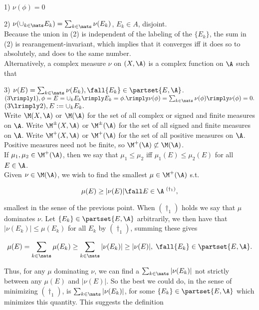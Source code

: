 1) $\nu(\phi) = 0$

2) $\nu( \cup_{k\in \nats} E_k ) = \sum_{k \in \nats} \nu(E_k) $, $E_k \in A$, disjoint.  \\

Because the union in (2) is independent of the labeling of the $\{ E_k \}$, the sum in (2) is rearangement-invariant, which implies that it converges iff it does so to absolutely, and does to the same number. \\

Alternatively, a complex measure $\nu$ on $(X,\A)$ is a complex function on $\A$ such that

3) $\nu(E) = \sum_{k \in \nats} \nu(E_k), \fall \{ E_k\} \in \partset{E, \A}$.\\

$(3 \rimply 1), \phi = E = \cup_k E_k \rimply E_k = \phi. \rimply \nu(\phi) = \sum_{k \in \nats } \nu(\phi) \rimply \nu(\phi) = 0.$ $(3 \lrimply 2), E := \cup_k E_k.$ \\



Write $\M(X,\A)$ or $\M(\A)$ for the set of all complex or signed and finite measures on $\A$.
Write $\M^\pm(X,\A)$ or $\M^\pm(\A)$ for the set of all signed and finite measures on $\A$.
Write $\M^+(X,\A)$ or $\M^+(\A)$ for the set of all positive measures on $\A$. 
Positive measures need not be finite, so $\M^+(\A) \not \subset \M(\A)$.
\\



If $\mu_1,\mu_2 \in \M^+(\A)$, then we say that $\mu_1 \le \mu_2$ iff $\mu_1(E) \le \mu_2(E)$ for all $E \in \A$.\\

Given $\nu \in \M(\A)$, we wish to find the smallest $\mu \in \M^+(\A)$ s.t.

$$
     \mu(E)  \ge |\nu(E)| \fall E \in \A  \; {}^{(\dagger_1)},
$$
 
\noindent
smallest in the sense of the previous point. When ${(\dagger_1)}$ holds we say that $\mu$ dominates $\nu$.  Let $\{ E_k \} \in \partset{E,\A}$ arbitrarily, we then have that $|\nu(E_k)| \le \mu(E_k)$ for all $E_k$ by ${(\dagger_1)}$, summing these gives 

$$
\mu(E) = \sum_{k \in \nats} \mu(E_k) \ge \sum_{k \in \nats} |\nu(E_k)| \ge | \nu(E)|, \; \fall \{ E_k\} \in \partset{E, \A}.
$$

\noindent
Thus, for any $\mu$ dominating $\nu$, we can find a $\sum_{k \in \nats} |\nu(E_k)|$ not strictly between any $\mu(E)$ and $|\nu(E)|$. So the best we could do, in the sense of minimizing ${(\dagger_1)}$, is $\sum_{k \in \nats} |\nu(E_k)|$, for some $ \{ E_k\} \in \partset{E, \A}$ which minimizes this quantity. This suggests the definition\\

